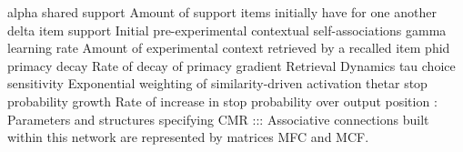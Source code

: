 {}\markdownRendererDollarSign{}\markdownRendererLeftBrace{}\markdownRendererBackslash{}alpha\markdownRendererRightBrace{}\markdownRendererDollarSign{} shared support Amount of support items initially have for one another \markdownRendererDollarSign{}\markdownRendererLeftBrace{}\markdownRendererBackslash{}delta\markdownRendererRightBrace{}\markdownRendererDollarSign{} item support Initial pre-experimental contextual self-associations \markdownRendererDollarSign{}\markdownRendererLeftBrace{}\markdownRendererBackslash{}gamma\markdownRendererRightBrace{}\markdownRendererDollarSign{} learning rate Amount of experimental context retrieved by a recalled item \markdownRendererDollarSign{}\markdownRendererLeftBrace{}\markdownRendererBackslash{}phi\markdownRendererRightBrace{}\markdownRendererLeftBrace{}d\markdownRendererRightBrace{}\markdownRendererDollarSign{} primacy decay Rate of decay of primacy gradient Retrieval Dynamics\markdownRendererLineBreak
{}\markdownRendererDollarSign{}\markdownRendererLeftBrace{}\markdownRendererBackslash{}tau\markdownRendererRightBrace{}\markdownRendererDollarSign{} choice sensitivity Exponential weighting of similarity-driven activation \markdownRendererDollarSign{}\markdownRendererLeftBrace{}\markdownRendererBackslash{}theta\markdownRendererRightBrace{}\markdownRendererLeftBrace{}r\markdownRendererRightBrace{}\markdownRendererDollarSign{} stop probability growth Rate of increase in stop probability over output position\markdownRendererInterblockSeparator
{}: Parameters and structures specifying CMR :::\markdownRendererInterblockSeparator
{}\markdownRendererInterblockSeparator
{}Associative connections built within this network are represented by matrices \markdownRendererDollarSign{}M\markdownRendererCircumflex{}\markdownRendererLeftBrace{}FC\markdownRendererRightBrace{}\markdownRendererDollarSign{} and \markdownRendererDollarSign{}M\markdownRendererCircumflex{}\markdownRendererLeftBrace{}CF\markdownRendererRightBrace{}\markdownRendererDollarSign{}.\markdownRendererInterblockSeparator

